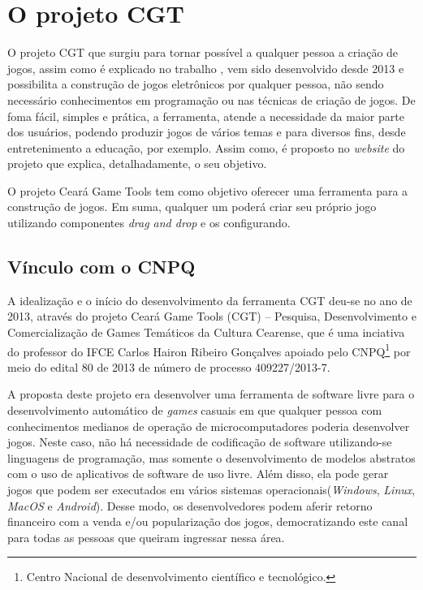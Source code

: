 \documentclass[12pt,oneside,openright,a4paper,english,brazil,sumario=tradicional]{abntex2}
\begin{document}
\section{O projeto CGT}
O projeto CGT que surgiu para tornar possível a qualquer pessoa a criação de jogos, assim como é explicado no trabalho \cite{monografia:aquino}, vem sido desenvolvido desde 2013 e possibilita a construção de jogos eletrônicos por qualquer pessoa, não sendo necessário conhecimentos em programação ou nas técnicas de criação de jogos. De foma fácil, simples e prática, a ferramenta, atende a necessidade da maior parte dos usuários, podendo produzir jogos de vários temas e para diversos fins, desde entretenimento a educação, por exemplo. Assim como, é proposto no \emph{website} do projeto que explica, detalhadamente, o seu objetivo.
\begin{citacao}
   O projeto Ceará Game Tools tem como objetivo oferecer uma ferramenta para a construção de jogos. Em suma, qualquer um poderá criar seu próprio jogo utilizando componentes \emph{drag and drop} e os configurando. \cite{website:projeto-cgt}
\end{citacao}
\subsection{Vínculo com o CNPQ}
A idealização e o início do desenvolvimento da ferramenta CGT deu-se no ano de 2013, através do projeto Ceará Game Tools (CGT) – Pesquisa, Desenvolvimento e Comercialização de Games Temáticos da Cultura Cearense, que é uma inciativa do professor do IFCE Carlos Hairon Ribeiro Gonçalves  apoiado pelo CNPQ\footnote{Centro Nacional de desenvolvimento científico e tecnológico.} por meio do edital 80 de 2013 de número de processo 409227/2013-7.

A proposta deste projeto era desenvolver uma ferramenta de software livre para o desenvolvimento automático de \emph{games} casuais em que qualquer pessoa com conhecimentos medianos de operação de microcomputadores poderia desenvolver jogos. Neste caso, não há necessidade de codificação de software utilizando-se linguagens de programação, mas somente o desenvolvimento de modelos abstratos com o uso de aplicativos de software de uso livre. Além disso, ela pode gerar jogos que podem ser executados em vários sistemas operacionais(\emph{Windows}, \emph{Linux}, \emph{MacOS} e \emph{Android}). Desse modo, os desenvolvedores podem aferir retorno financeiro com a venda e/ou popularização dos jogos, democratizando este canal para todas as pessoas que queiram ingressar nessa área.
\end{document}
